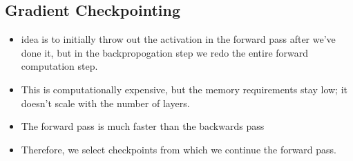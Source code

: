 \documentclass[11pt]{article}
\begin{document}
\subsection{Gradient Checkpointing}

\begin{minipage}[l]{.5\linewidth}
    \begin{figure}[H]
        \centering
    \end{figure}    
\end{minipage}\hfill
\begin{minipage}[r]{.48\linewidth}
    \begin{itemize}
        \item idea is to initially throw out the activation in the forward pass after we've done it, but in the backpropogation step we redo the entire forward computation step.
        \item This is computationally expensive, but the memory requirements stay low; it doesn't scale with the number of layers.
        \item The forward pass is much faster than the backwards pass
        \item Therefore, we select checkpoints from which we continue the forward pass. 
    \end{itemize}
\end{minipage}
\end{document}
